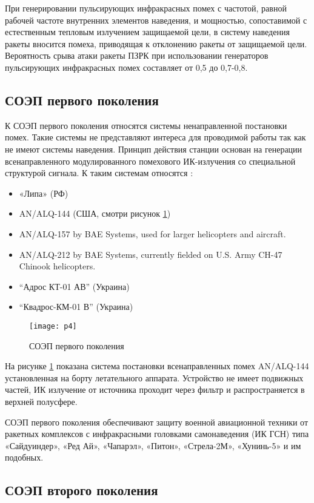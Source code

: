 При генерировании пульсирующих инфракрасных помех с частотой, равной рабочей частоте внутренних элементов наведения, и мощностью, сопоставимой с естественным тепловым излучением защищаемой цели, в систему наведения ракеты вносится помеха, приводящая к отклонению ракеты от защищаемой цели. Вероятность срыва атаки ракеты ПЗРК при использовании генераторов пульсирующих инфракрасных помех составляет от 0,5 до 0,7-0,8.

\subsection{СОЭП первого поколения}	

К СОЭП первого поколения относятся системы ненаправленной постановки помех. Такие системы не представляют интереса для проводимой работы так как не имеют системы наведения. Принцип действия станции основан на генерации всенаправленного модулированного помехового ИК-излучения со специальной структурой сигнала. К таким системам относятся \cite[]{SOEP_LIPA}:

\begin{itemize}
	\item «Липа» (РФ)	
	\item AN/ALQ-144 (США, смотри рисунок \ref{fig:alq})	
	\item AN/ALQ-157 by BAE Systems, used for larger helicopters and aircraft.
	\item AN/ALQ-212 by BAE Systems, currently fielded on U.S. Army CH-47 Chinook helicopters.
	\item “Адрос КТ-01 АВ” (Украина)
	\item “Квадрос-КМ-01 В” (Украина) 		
\end{itemize}

\begin{figure}[ht]
	\centering
	\texttt{[image: p4]} 
	\caption{СОЭП первого поколения}
	\label{fig:alq}
\end{figure}
На рисунке \ref{fig:alq} показана система постановки всенаправленных помех AN/ALQ-144 установленная на борту летательного аппарата. Устройство не имеет подвижных частей, ИК излучение от источника проходит через фильтр и распространяется в верхней полусфере.

СОЭП первого поколения обеспечивают защиту военной авиационной техники от ракетных комплексов с инфракрасными головками самонаведения (ИК ГСН) типа «Сайдуиндер», «Ред Ай», «Чапарэл», «Питон», «Стрела-2М», «Хунинь-5» и им подобных. 

\subsection{СОЭП второго поколения}	

